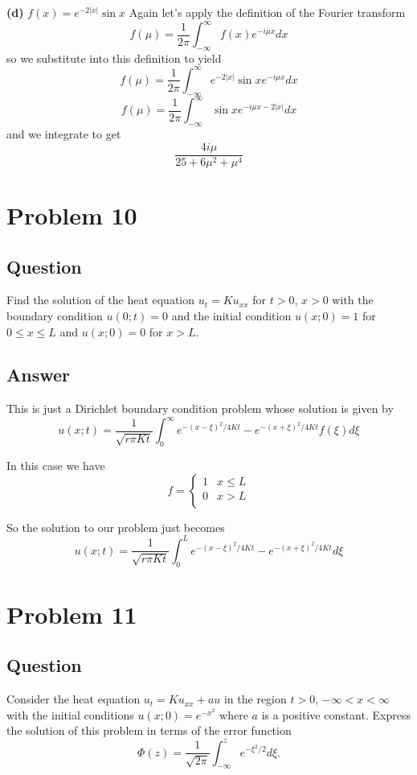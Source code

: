 \documentclass[12pt]{article}
\begin{document}
\textbf{(d)} \emph{$f(x) = e^{-2 |x|} \sin{x}$}
Again let's apply the definition of the Fourier transform
\[f(\mu) = \frac{1}{2 \pi} \int_{-\infty}^\infty f(x) e^{-i \mu x} dx\]
so we substitute into this definition to yield
\[f(\mu) = \frac{1}{2 \pi} \int_{-\infty}^\infty  e^{-2 |x|} \sin{x} e^{-i \mu x} dx\]
\[f(\mu) = \frac{1}{2 \pi} \int_{-\infty}^\infty   \sin{x} e^{-i \mu x-2 |x|} dx\]
and we integrate to get
\[\frac{4 i  \mu }{25+6 \mu ^2+\mu ^4}\]


\section{Problem 10}
\subsection{Question}
Find the solution of the heat equation $u_t=K u_{xx}$ for $t>0$, $x>0$ with the boundary condition $u(0;t) = 0$ and the initial condition $u(x;0) = 1$ for $0\leq x \leq L$ and $u(x;0) = 0$ for $x>L$.

\subsection{Answer}
This is just a Dirichlet boundary condition problem whose solution is given \cite[Page 304]{pinsky} by 
\[u(x;t)=\frac{1}{\sqrt{r \pi K t}}\int_0^\infty e^{-(x-\xi)^2/4 K t}-e^{-(x+\xi)^2/4 K t} f(\xi) d\xi\]

In this case we have 
\[f=\left\{\begin{array}{lr}
1& x \leq L\\
0 & x > L\\
\end{array}\right.\]

So the solution to our problem just becomes 
\[u(x;t)=\frac{1}{\sqrt{r \pi K t}}\int_0^L e^{-(x-\xi)^2/4 K t}-e^{-(x+\xi)^2/4 K t}  d\xi\]


\section{Problem 11}
\subsection{Question}
Consider the heat equation $u_t = K u_{xx} + a u$ in the region $t>0$, $-\infty < x < \infty$ with the initial conditions $u(x;0) = e^{-x^2}$ where $a$ is a positive constant. Express the solution of this problem in terms of the error function
\[\Phi(z) = \frac{1}{\sqrt{2 \pi}} \int_{-\infty}^z e^{-\xi^2 /2} d \xi .\]
\end{document}
